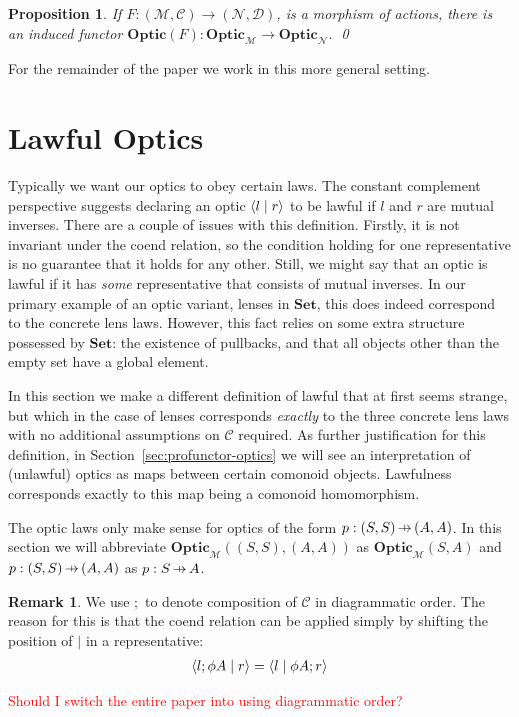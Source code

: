\documentclass[11pt,letterpaper]{article}
\theoremstyle{plain}
\newtheorem{proposition}[theorem]{Proposition}
\theoremstyle{definition}
\newtheorem{remark}[theorem]{Remark}
\newcommand{\C}{\mathscr{C}}
\newcommand{\D}{\mathscr{D}}
\newcommand{\M}{\mathscr{M}}
\newcommand{\N}{\mathscr{N}}
\newcommand{\Set}{\mathbf{Set}}
\newcommand{\Optic}{\mathbf{Optic}}
\newcommand{\rep}[2]{{\ensuremath \left\langle #1 \mid #2 \right\rangle}}
\newcommand{\hto}{\ensuremath{\,\mathaccent\shortmid\rightarrow\,}}
\newcommand{\todo}[1]{\textcolor{red}{\small #1}}
\begin{document}
\begin{proposition}\label{prop:change-of-action}
If $F : (\M, \C) \to (\N, \D)$, is a morphism of actions, there is an induced functor $\Optic(F) : \Optic_\M \to \Optic_\N$. \qed
\end{proposition}

For the remainder of the paper we work in this more general setting.

\section{Lawful Optics}\label{sec:lawful-optics}
Typically we want our optics to obey certain laws. The constant complement perspective suggests declaring an optic $\rep{l}{r}$ to be lawful if $l$ and $r$ are mutual inverses. There are a couple of issues with this definition. Firstly, it is not invariant under the coend relation, so the condition holding for one representative is no guarantee that it holds for any other. Still, we might say that an optic is lawful if it has \emph{some} representative that consists of mutual inverses. In our primary example of an optic variant, lenses in $\Set$, this does indeed correspond to the concrete lens laws. However, this fact relies on some extra structure possessed by $\Set$: the existence of pullbacks, and that all objects other than the empty set have a global element.

In this section we make a different definition of lawful that at first seems strange, but which in the case of lenses corresponds \emph{exactly} to the three concrete lens laws with no additional assumptions on $\C$ required. As further justification for this definition, in Section~\ref{sec:profunctor-optics} we will see an interpretation of (unlawful) optics as maps between certain comonoid objects. Lawfulness corresponds exactly to this map being a comonoid homomorphism.

The optic laws only make sense for optics of the form $p : (S,S) \hto (A, A)$. In this section we will abbreviate $\Optic_\M((S, S), (A, A))$ as $\Optic_\M(S, A)$ and $p : (S, S) \hto (A, A)$ as $p : S \hto A$.

\begin{remark}
We use $;$ to denote composition of $\C$ in diagrammatic order. The reason for this is that the coend relation can be applied simply by shifting the position of $\mid$ in a representative:
\begin{align*}
\rep{l;\phi A}{r} = \rep{l}{\phi A;r}
\end{align*}

\todo{Should I switch the entire paper into using diagrammatic order?}
\end{remark}
\end{document}
